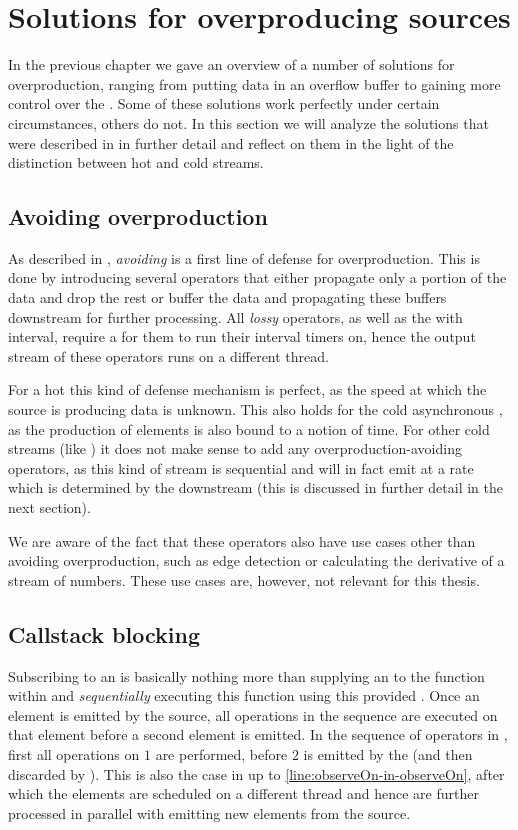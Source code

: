 \section{Solutions for overproducing sources}
In the previous chapter we gave an overview of a number of solutions for overproduction, ranging from putting data in an overflow buffer to gaining more control over the \obs. Some of these solutions work perfectly under certain circumstances, others do not. In this section we will analyze the solutions that were described in  in further detail and reflect on them in the light of the distinction between hot and cold streams.

\subsection{Avoiding overproduction}
As described in , \textit{avoiding} is a first line of defense for overproduction. This is done by introducing several operators that either propagate only a portion of the data and drop the rest or buffer the data and propagating these buffers downstream for further processing. All \textit{lossy} operators, as well as the  with interval, require a \sch for them to run their interval timers on, hence the output stream of these operators runs on a different thread.

For a hot \obs this kind of defense mechanism is perfect, as the speed at which the source is producing data is unknown. This also holds for the cold asynchronous \obs, as the production of elements is also bound to a notion of time. For other cold streams (like ) it does not make sense to add any overproduction-avoiding operators, as this kind of stream is sequential and will in fact emit at a rate which is determined by the downstream (this is discussed in further detail in the next section).

We are aware of the fact that these operators also have use cases other than avoiding overproduction, such as edge detection or calculating the derivative of a stream of numbers. These use cases are, however, not relevant for this thesis.

\subsection{Callstack blocking}
Subscribing to an \obs is basically nothing more than supplying an \obv to the function within  and \emph{sequentially} executing this function using this provided \obv. Once an element is emitted by the source, all operations in the \obs sequence are executed on that element before a second element is emitted. In the sequence of operators in , first all operations on $1$ are performed, before $2$ is emitted by the \obs (and then discarded by ). This is also the case in  up to \cref{line:observeOn-in-observeOn}, after which the elements are scheduled on a different thread and hence are further processed in parallel with emitting new elements from the source.

